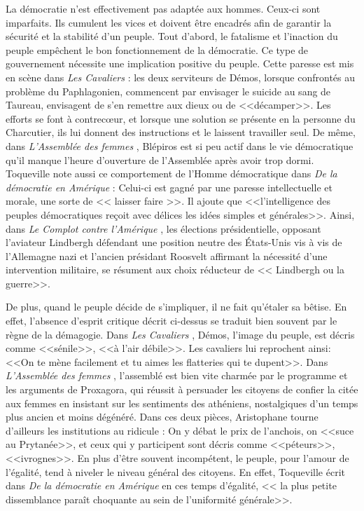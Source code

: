 \documentclass[a4paper]{article}
\newcommand{\cav}{\textit{Les Cavaliers }}
\newcommand{\adf}{\textit{L'Assemblée des femmes }}
\newcommand{\dda}{\textit{De la démocratie en Amérique }}
\newcommand{\cca}{\textit{Le Complot contre l'Amérique }}
\begin{document}
	La démocratie n'est effectivement pas adaptée aux hommes. Ceux-ci sont imparfaits. Ils cumulent les vices et doivent être encadrés afin de garantir la sécurité et la stabilité d'un peuple. 
	Tout d'abord, le fatalisme et l'inaction du peuple empêchent le bon fonctionnement de la démocratie. Ce type de gouvernement nécessite une implication positive du peuple. Cette paresse est mis en scène dans \cav : les deux serviteurs de Démos, lorsque confrontés au problème du Paphlagonien, commencent par envisager le suicide au sang de Taureau, envisagent de s'en remettre aux dieux ou de <<décamper>>. Les efforts se font à contrecœur, et lorsque une solution se présente en la personne du Charcutier, ils lui donnent des instructions et le laissent travailler seul. De même, dans \adf, Blépiros est si peu actif dans le vie démocratique qu'il manque l'heure d'ouverture de l'Assemblée après avoir trop dormi. Toqueville note aussi ce comportement de l'Homme démocratique dans \dda : Celui-ci est gagné par une paresse intellectuelle et morale, une sorte de << laisser faire >>. Il ajoute que <<l'intelligence des peuples démocratiques reçoit avec délices les idées simples et générales>>. Ainsi, dans \cca, les élections présidentielle, opposant l'aviateur Lindbergh défendant une position neutre des États-Unis vis à vis de l'Allemagne nazi et l'ancien présidant Roosvelt affirmant la nécessité d'une intervention militaire, se résument aux choix réducteur de << Lindbergh ou la guerre>>. 

	De plus, quand le peuple décide de s'impliquer, il ne fait qu'étaler sa bêtise. En effet, l'absence d'esprit critique décrit ci-dessus se traduit bien souvent par le règne de la démagogie. Dans \cav, Démos, l'image du peuple, est décris comme <<sénile>>, <<à l'air débile>>. Les cavaliers lui reprochent ainsi: <<On te mène facilement et tu aimes les flatteries qui te dupent>>. Dans \adf, l'assemblé est bien vite charmée par le programme et les arguments de Proxagora, qui réussit à persuader les citoyens de confier la citée aux femmes en insistant sur les sentiments des athéniens, nostalgiques d'un temps plus ancien et moins dégénéré. Dans ces deux pièces, Aristophane tourne d'ailleurs les institutions au ridicule : On y débat le prix de l'anchois, on <<suce au Prytanée>>,  et ceux qui y participent sont décris comme <<péteurs>>, <<ivrognes>>. En plus d'être souvent incompétent, le peuple, pour l'amour de l'égalité, tend à niveler le niveau général des citoyens. En effet, Toqueville écrit dans \dda en ces temps d'égalité, << la plus petite dissemblance paraît choquante  au sein de l'uniformité générale>>.
		
\end{document}
